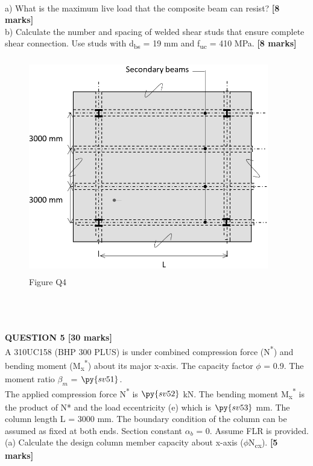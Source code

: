 \documentclass[a4paper,11pt]{article}
\begin{document}
\\
a) What is the maximum live load that the composite beam can resist? \textbf{[8 marks]}\\
b) Calculate the number and spacing of welded shear studs that ensure complete shear connection. Use studs with d\textsubscript{bs} = 19 mm and f\textsubscript{uc} = 410 MPa. \textbf{[8 marks]}\\
\begin{figure}[ht]
\includegraphics[width=10.47cm, height=9.39cm]{P4.png}\\
\centering
Figure Q4\\
\centering
\end{figure}
\\
\\
\\
\textbf{QUESTION 5 [30 marks]}\\
A 310UC158 (BHP 300 PLUS) is under combined compression force (N\textsuperscript{*}) and bending moment (M\textsubscript{x}\textsuperscript{*}) about its major x-axis. The capacity factor $\phi$ = 0.9. The moment ratio $\beta_m$ = $\py{sv51}$.\\
The applied compression force N\textsuperscript{*} is $\py{sv52}$ kN.  The bending moment M\textsubscript{x}\textsuperscript{*} is the product of N* and the load eccentricity (e) which is $\py{sv53}$ mm. The column length L = 3000 mm. The boundary condition of the column can be assumed as fixed at both ends. Section constant $\alpha_b$ = 0. Assume FLR is provided.\\
(a)	Calculate the design column member capacity about x-axis ($\phi$N\textsubscript{cx}). \textbf{[5 marks]}\\
\end{document}
